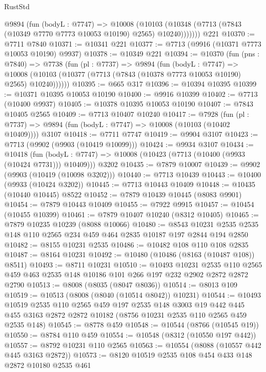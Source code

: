 \begin{lexlean}{RustStd}
\begin{coremodule}
        @9894
          (fun (bodyL : @7747) =>
          @10008
            (@10103 (@10348 (@7713 (@7843 (@10349 @7770 @7773 @10053 @10190) @2565) @10240)))))))
    @221
@10370 := @7711 @7840
@10371 := @10341 @221
@10377 := @7713 (@9916 (@10371 @7773 @10053 @10190) @9937)
@10378 := @10349 @221
@10394 := @10370
    (fun (pns : @7840) =>
    @7738
      (fun (pl : @7737) =>
      @9894
        (fun (bodyL : @7747) =>
        @10008 (@10103 (@10377 (@7713 (@7843 (@10378 @7773 @10053 @10190) @2565) @10240))))))
@10395 := @665 @317
@10396 := @10394 @10395
@10399 := @10371 @10395 @10053 @10190
@10400 := @9916 @10399
@10402 := @7713 (@10400 @9937)
@10405 := @10378 @10395 @10053 @10190
@10407 := @7843 @10405 @2565
@10409 := @7713 @10407 @10240
@10417 := @7928
    (fun (pl : @7737) => @9894 (fun (bodyL : @7747) => @10008 (@10103 (@10402 @10409))))
    @3107
@10418 := @7711 @7747
@10419 := @9904 @3107
@10423 := @7713 (@9902 (@9903 (@10419 @10099)))
@10424 := @9934 @3107
@10434 := @10418
    (fun (bodyL : @7747) => @10008 (@10423 (@7713 (@10400 (@9933 (@10424 @7731))) @10409)))
    @3202
@10435 := @7879 @10007
@10439 := @9902 (@9903 (@10419 (@10098 @3202)))
@10440 := @7713 @10439
@10443 := @10400 (@9933 (@10424 @3202))
@10445 := @7713 @10443 @10409
@10448 := @10435 (@10440 @10445) @8522
@10452 := @7879 @10439 @10445 (@8083 @9901)
@10454 := @7879 @10443 @10409
@10455 := @7922 @9915
@10457 := @10454 (@10455 @10399)
@10461 := @7879 @10407 @10240 (@8312 @10405)
@10465 := @7879 @10235 @10239 (@8088 @10066)
@10480 := @8543 @10231 @2535 @2535 @148 @110 @2565 @234 @459 @464 @2835 @10187 @197 @2844 @194 @2850
@10482 := @8155 @10231 @2535
@10486 := @10482 @108 @110 @108 @2835
@10487 := @8164 @10231
@10492 := @10480 (@10486 (@8163 (@10487 @108)) @8511)
@10493 := @8711 @10231
@10510 := @10493
    @10231
    @2535
    @110
    @2565
    @459
    @463
    @2535
    @148
    @10186
    @101
    @266
    @197
    @232
    @2902
    @2872
    @2872
    @2790
@10513 := @8008 (@8035 (@8047 @8036))
@10514 := @8013 @109
@10519 := @10513 (@8008 (@8040 (@10514 @8042)) @10231)
@10544 := @10493
    @10519
    @2535
    @110
    @2565
    @459
    @197
    @2535
    @148
    @3003
    @19
    @442
    @445
    @455
    @3163
    @2872
    @2872
    @10182
    (@8756 @10231 @2535 @110 @2565 @459 @2535 @148)
@10545 := @8778 @459
@10548 := @10544 (@8766 (@10545 @19))
@10550 := @8784 @110 @459
@10554 := @10548 (@8312 (@10550 @197 @442))
@10557 := @8792 @10231 @110 @2565
@10563 := @10554 (@8088 (@10557 @442 @445 @3163 @2872))
@10573 := @8120 @10519 @2535 @108 @454 @433 @148 @2872 @10180 @2535 @461

\end{coremodule}
\end{lexlean}
